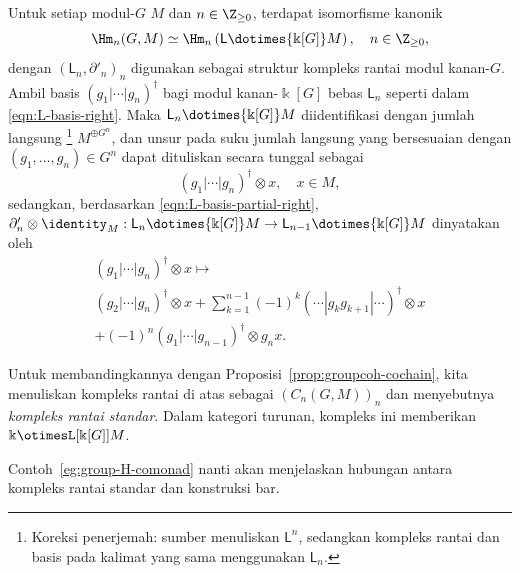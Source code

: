 \begin{proposisi}\label{prop:grouph-chain}
	Untuk setiap modul-$G$ $M$ dan $n\in\Z_{\geq0}$, terdapat isomorfisme
	kanonik
	\[ \Hm_n(G, M) \simeq \Hm_n\left( \mathsf{L} \dotimes{\Bbbk[G]} M\right), \quad n \in \Z_{\geq 0}, \]
	dengan $(\mathsf{L}_n,\partial'_n)_n$ digunakan sebagai struktur kompleks
	rantai modul kanan-$G$. Ambil basis
	$(g_1|\cdots|g_n)^\dagger$ bagi modul kanan-$\Bbbk[G]$ bebas
	$\mathsf{L}_n$ seperti dalam \eqref{eqn:L-basis-right}. Maka
	$\mathsf{L}_n\dotimes{\Bbbk[G]}M$ diidentifikasi dengan jumlah langsung
	\footnote{Koreksi penerjemah: sumber menuliskan $\mathsf{L}^n$, sedangkan
	kompleks rantai dan basis pada kalimat yang sama menggunakan $\mathsf{L}_n$.}
	$M^{\oplus G^n}$, dan unsur pada suku jumlah langsung yang bersesuaian
	dengan $(g_1,\ldots,g_n)\in G^n$ dapat dituliskan secara tunggal sebagai
	\[ (g_1 | \cdots | g_n)^\dagger \otimes x, \quad x \in M, \]
	sedangkan, berdasarkan \eqref{eqn:L-basis-partial-right},
	$\partial'_n\otimes\identity_M:\mathsf{L}_n\dotimes{\Bbbk[G]}M\to
	\mathsf{L}_{n-1}\dotimes{\Bbbk[G]}M$ dinyatakan oleh
	\begin{multline*}
		(g_1 | \cdots | g_n)^\dagger \otimes x \mapsto \\
		(g_2 | \cdots | g_n)^\dagger \otimes x + \sum_{k=1}^{n-1} (-1)^k (\cdots | g_k g_{k+1} | \cdots)^\dagger \otimes x \\
		+ (-1)^n (g_1 | \cdots | g_{n-1})^\dagger \otimes g_n x.
	\end{multline*}

	Untuk membandingkannya dengan Proposisi~\ref{prop:groupcoh-cochain}, kita
	menuliskan kompleks rantai di atas sebagai $(C_n(G,M))_n$ dan menyebutnya
	\emph{kompleks rantai standar}. Dalam kategori turunan, kompleks ini
	memberikan $\Bbbk\otimesL[{\Bbbk[G]}]M$.
\end{proposisi}

Contoh~\ref{eg:group-H-comonad} nanti akan menjelaskan hubungan antara
kompleks rantai standar dan konstruksi bar.

